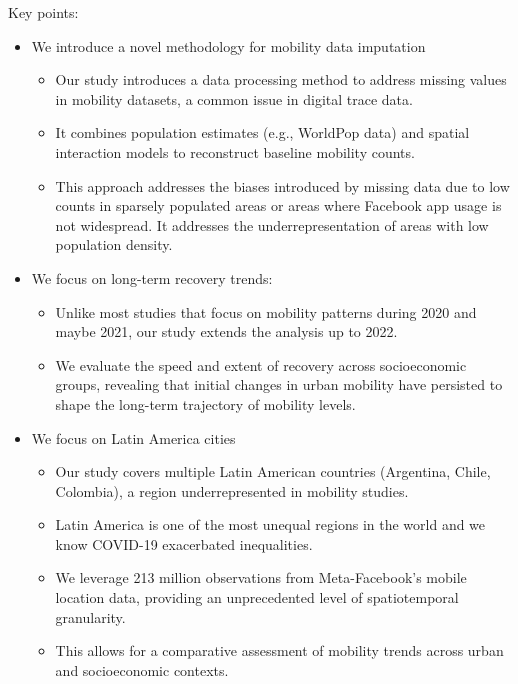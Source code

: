 \documentclass[fleqn,10pt]{letter}
\begin{document}

Key points:


\begin{itemize}
    \item We introduce a novel methodology for mobility data imputation
    \begin{itemize}
        \item Our study introduces a data processing method to address missing values in mobility datasets, a common issue in digital trace data.
        \item It combines population estimates (e.g., WorldPop data) and spatial interaction models to reconstruct baseline mobility counts.
        \item This approach addresses the biases introduced by missing data due to low counts in sparsely populated areas or areas where Facebook app usage is not widespread. It addresses the underrepresentation of areas with low population density.
    \end{itemize}
    
    \item We focus on long-term recovery trends:
    \begin{itemize}
        \item Unlike most studies that focus on mobility patterns during 2020 and maybe 2021, our study extends the analysis up to 2022.
        \item We evaluate the speed and extent of recovery across socioeconomic groups, revealing that initial changes in urban mobility have persisted to shape the long-term trajectory of mobility levels.
    \end{itemize}
    
    \item We focus on Latin America cities
    \begin{itemize}
        \item Our study covers multiple Latin American countries (Argentina, Chile, Colombia), a region underrepresented in mobility studies.
        \item Latin America is one of the most unequal regions in the world and we know COVID-19 exacerbated inequalities.
        \item We leverage 213 million observations from Meta-Facebook’s mobile location data, providing an unprecedented level of spatiotemporal granularity.
        \item This allows for a comparative assessment of mobility trends across urban and socioeconomic contexts.
    \end{itemize}
    

\end{itemize}
\end{document}
